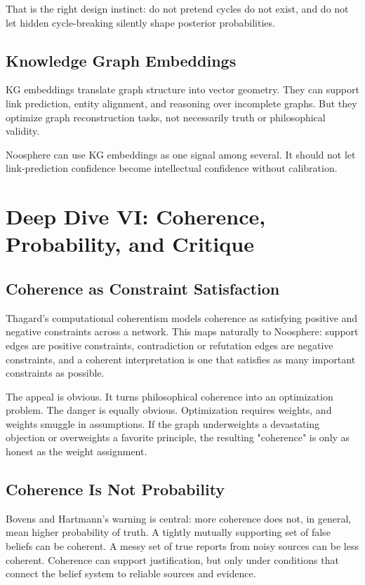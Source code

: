 \documentclass[11pt]{article}
\begin{document}
That is the right design instinct: do not pretend cycles do not exist, and do
not let hidden cycle-breaking silently shape posterior probabilities.

\subsection{Knowledge Graph Embeddings}

KG embeddings translate graph structure into vector geometry. They can support
link prediction, entity alignment, and reasoning over incomplete graphs. But
they optimize graph reconstruction tasks, not necessarily truth or
philosophical validity.

Noosphere can use KG embeddings as one signal among several. It should not let
link-prediction confidence become intellectual confidence without calibration.

\section{Deep Dive VI: Coherence, Probability, and Critique}

\subsection{Coherence as Constraint Satisfaction}

Thagard's computational coherentism models coherence as satisfying positive
and negative constraints across a network. This maps naturally to Noosphere:
support edges are positive constraints, contradiction or refutation edges are
negative constraints, and a coherent interpretation is one that satisfies as
many important constraints as possible.

The appeal is obvious. It turns philosophical coherence into an optimization
problem. The danger is equally obvious. Optimization requires weights, and
weights smuggle in assumptions. If the graph underweights a devastating
objection or overweights a favorite principle, the resulting "coherence" is
only as honest as the weight assignment.

\subsection{Coherence Is Not Probability}

Bovens and Hartmann's warning is central: more coherence does not, in general,
mean higher probability of truth. A tightly mutually supporting set of false
beliefs can be coherent. A messy set of true reports from noisy sources can be
less coherent. Coherence can support justification, but only under conditions
that connect the belief system to reliable sources and evidence.
\end{document}
